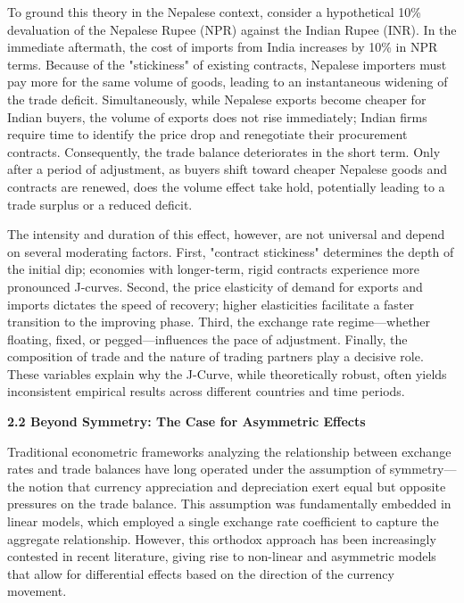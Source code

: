 \documentclass[12pt]{article}
\begin{document}
To ground this theory in the Nepalese context, consider a hypothetical 10\% devaluation of the Nepalese Rupee (NPR) against the Indian Rupee (INR). In the immediate aftermath, the cost of imports from India increases by 10\% in NPR terms. Because of the "stickiness" of existing contracts, Nepalese importers must pay more for the same volume of goods, leading to an instantaneous widening of the trade deficit. Simultaneously, while Nepalese exports become cheaper for Indian buyers, the volume of exports does not rise immediately; Indian firms require time to identify the price drop and renegotiate their procurement contracts. Consequently, the trade balance deteriorates in the short term. Only after a period of adjustment, as buyers shift toward cheaper Nepalese goods and contracts are renewed, does the volume effect take hold, potentially leading to a trade surplus or a reduced deficit.

The intensity and duration of this effect, however, are not universal and depend on several moderating factors. First, "contract stickiness" determines the depth of the initial dip; economies with longer-term, rigid contracts experience more pronounced J-curves. Second, the price elasticity of demand for exports and imports dictates the speed of recovery; higher elasticities facilitate a faster transition to the improving phase. Third, the exchange rate regime—whether floating, fixed, or pegged—influences the pace of adjustment. Finally, the composition of trade and the nature of trading partners play a decisive role. These variables explain why the J-Curve, while theoretically robust, often yields inconsistent empirical results across different countries and time periods.

\vspace{0.5cm}
\noindent\textbf{2.2 Beyond Symmetry: The Case for Asymmetric Effects}

Traditional econometric frameworks analyzing the relationship between exchange rates and trade balances have long operated under the assumption of symmetry—the notion that currency appreciation and depreciation exert equal but opposite pressures on the trade balance. This assumption was fundamentally embedded in linear models, which employed a single exchange rate coefficient to capture the aggregate relationship. However, this orthodox approach has been increasingly contested in recent literature, giving rise to non-linear and asymmetric models that allow for differential effects based on the direction of the currency movement.
\end{document}
